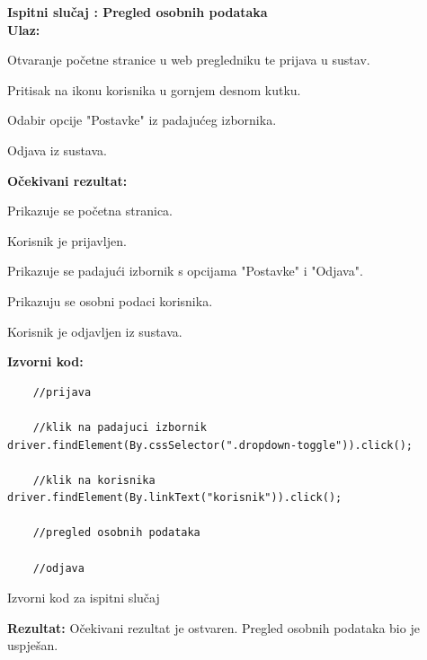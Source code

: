 			\noindent \textbf{Ispitni slučaj \thetestcase: Pregled osobnih podataka} \\
			\noindent \textbf{Ulaz:}
			\begin{packed_enum}
				\item Otvaranje početne stranice u web pregledniku te prijava u sustav\footnotemark.
				\item Pritisak na ikonu korisnika u gornjem desnom kutku.
				\item Odabir opcije "Postavke" iz padajućeg izbornika.
				\item Odjava iz sustava\footnotemark[\value{footnote}].

			\end{packed_enum}
			\noindent \textbf{Očekivani rezultat:}
			\begin{packed_enum}
				\item[1.a] Prikazuje se početna stranica.
				\item[1.b] Korisnik je prijavljen.
				\item[2.\ \ ] Prikazuje se padajući izbornik s opcijama "Postavke" i "Odjava".
				\item[3.\ \ ] Prikazuju se osobni podaci korisnika.
				\item[4.\ \ ] Korisnik je odjavljen iz sustava.
			\end{packed_enum}
			\noindent \textbf{Izvorni kod:}

			\begin{listing}[H]

\begin{verbatim}
    //prijava
    
    //klik na padajuci izbornik
driver.findElement(By.cssSelector(".dropdown-toggle")).click();
    
    //klik na korisnika
driver.findElement(By.linkText("korisnik")).click();

    //pregled osobnih podataka

    //odjava
\end{verbatim}
				\caption{Izvorni kod za ispitni slučaj \thetestcase}
				\label{test3}
			\end{listing}
			\noindent \textbf{Rezultat:} Očekivani rezultat je ostvaren. Pregled osobnih podataka bio je uspješan. 
			
